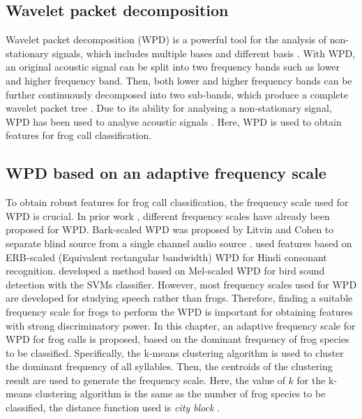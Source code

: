 \subsection{Wavelet packet decomposition}
Wavelet packet decomposition (WPD) is a powerful tool for the analysis of non-stationary signals, which includes multiple bases and different basis \citep{selin2007wavelets}. With WPD, an original acoustic signal can be split into two frequency bands such as lower and higher frequency band. Then, both lower and higher frequency bands can be further continuously decomposed into two sub-bands, which produce a complete wavelet packet tree \citep{farooq2001mel}. Due to its ability for analysing a non-stationary signal, WPD has been used to analyse acoustic signals \citep{selin2007wavelets, ren2008perceptually}. Here, WPD is used to obtain features for frog call classification. 

\subsection{WPD based on an adaptive frequency scale}
To obtain robust features for frog call classification, the frequency scale used for WPD is crucial. In prior work \citep{barkWPDraey, Biswas20141111, Zhang2015108}, different frequency scales have already been proposed for WPD. Bark-scaled WPD was proposed by Litvin and Cohen to separate blind source from a single channel audio source \citep{barkWPDraey}. \cite{Biswas20141111} used features based on ERB-scaled (Equivalent rectangular bandwidth) WPD for Hindi consonant recognition.  \cite{Zhang2015108} developed a method based on Mel-scaled WPD for bird sound detection with the SVMs classifier. However, most frequency scales used for WPD are developed for studying speech rather than frogs. Therefore, finding a suitable frequency scale for frogs to perform the WPD is important for obtaining features with strong discriminatory power. In this chapter, an adaptive frequency scale for WPD for frog calls is proposed,  based on the dominant frequency of frog species to be classified. Specifically, the k-means clustering algorithm is used to cluster the dominant frequency of all syllables. Then, the centroids of the clustering result are used to generate the frequency scale. Here, the value of $k$ for the k-means clustering algorithm is the same as the number of frog species to be classified, the distance function used is \textit{city block} \citep{Melter1987235}. 


%
%




